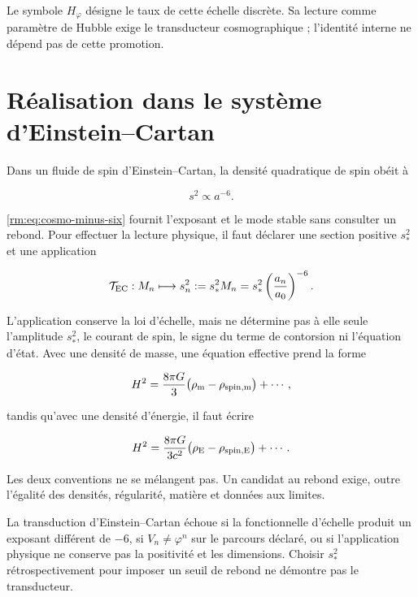 Le symbole \(H_\varphi\) désigne le taux de cette échelle discrète. Sa lecture comme paramètre de Hubble exige le transducteur cosmographique ; l’identité interne ne dépend pas de cette promotion.

\section{Réalisation dans le système d’Einstein--Cartan}

Dans un fluide de spin d’Einstein--Cartan, la densité quadratique de spin obéit à

\begin{equation}
s^2\propto a^{-6}.
\label{rm:eq:cosmo-EC-scaling}
\end{equation}

\cref{rm:eq:cosmo-minus-six} fournit l’exposant et le mode stable sans consulter un rebond. Pour effectuer la lecture physique, il faut déclarer une section positive \(s_*^2\) et une application

\begin{equation}
\mathcal T_{\rm EC}:M_n\longmapsto
s_n^2:=s_*^2M_n
=s_*^2\left(\frac{a_n}{a_0}\right)^{-6}.
\label{rm:eq:cosmo-EC-transducer}
\end{equation}

L’application conserve la loi d’échelle, mais ne détermine pas à elle seule l’amplitude \(s_*^2\), le courant de spin, le signe du terme de contorsion ni l’équation d’état. Avec une densité de masse, une équation effective prend la forme

\begin{equation}
H^2=\frac{8\pi G}{3}
\bigl(\rho_{\rm m}-\rho_{\rm spin,m}\bigr)+\cdots,
\label{rm:eq:cosmo-EC-mass}
\end{equation}

tandis qu’avec une densité d’énergie, il faut écrire

\begin{equation}
H^2=\frac{8\pi G}{3c^2}
\bigl(\rho_{\rm E}-\rho_{\rm spin,E}\bigr)+\cdots.
\label{rm:eq:cosmo-EC-energy}
\end{equation}

Les deux conventions ne se mélangent pas. Un candidat au rebond exige, outre l’égalité des densités, régularité, matière et données aux limites.

\begin{falsifier}
La transduction d’Einstein--Cartan échoue si la fonctionnelle d’échelle produit un exposant différent de \(-6\), si \(V_n\ne\varphi^n\) sur le parcours déclaré, ou si l’application physique ne conserve pas la positivité et les dimensions. Choisir \(s_*^2\) rétrospectivement pour imposer un seuil de rebond ne démontre pas le transducteur.
\end{falsifier}

